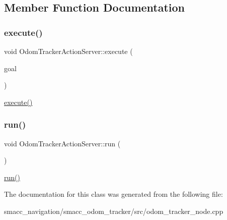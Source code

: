 \subsection{Member Function Documentation}
\mbox{\label{classOdomTrackerActionServer_af8a72e60dfa1b6224d5c0a9cc9ae68a8}} 
\subsubsection{\texorpdfstring{execute()}{execute()}}
{\footnotesize\ttfamily void Odom\+Tracker\+Action\+Server\+::execute (\begin{DoxyParamCaption}\item[{const smacc\+\_\+odom\+\_\+tracker\+::\+Odom\+Tracker\+Goal\+Const\+Ptr \&}]{goal }\end{DoxyParamCaption})\hspace{0.3cm}{\ttfamily [inline]}}

\hyperlink{classOdomTrackerActionServer_af8a72e60dfa1b6224d5c0a9cc9ae68a8}{execute()} \mbox{\label{classOdomTrackerActionServer_a8ab6984c7383949a048d72437e9f79d3}} 
\subsubsection{\texorpdfstring{run()}{run()}}
{\footnotesize\ttfamily void Odom\+Tracker\+Action\+Server\+::run (\begin{DoxyParamCaption}{ }\end{DoxyParamCaption})\hspace{0.3cm}{\ttfamily [inline]}}

\hyperlink{classOdomTrackerActionServer_a8ab6984c7383949a048d72437e9f79d3}{run()} 

The documentation for this class was generated from the following file\+:\begin{DoxyCompactItemize}
\item 
smacc\+\_\+navigation/smacc\+\_\+odom\+\_\+tracker/src/odom\+\_\+tracker\+\_\+node.\+cpp\end{DoxyCompactItemize}
